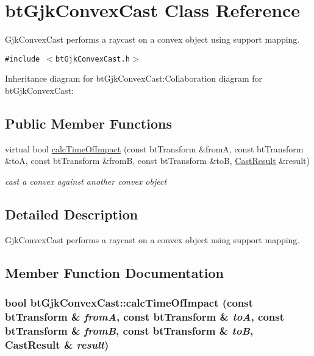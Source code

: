 \hypertarget{classbt_gjk_convex_cast}{
\section{btGjkConvexCast Class Reference}
\label{classbt_gjk_convex_cast}
}
GjkConvexCast performs a raycast on a convex object using support mapping.  


{\tt \#include $<$btGjkConvexCast.h$>$}

Inheritance diagram for btGjkConvexCast:Collaboration diagram for btGjkConvexCast:\subsection*{Public Member Functions}
\begin{CompactItemize}
\item 
virtual bool \hyperlink{classbt_gjk_convex_cast_814009e1ebc582495689f365a42ce2c1}{calcTimeOfImpact} (const btTransform \&fromA, const btTransform \&toA, const btTransform \&fromB, const btTransform \&toB, \hyperlink{structbt_convex_cast_1_1_cast_result}{CastResult} \&result)
\begin{CompactList}\small\item\em cast a convex against another convex object \item\end{CompactList}\end{CompactItemize}


\subsection{Detailed Description}
GjkConvexCast performs a raycast on a convex object using support mapping. 

\subsection{Member Function Documentation}
\hypertarget{classbt_gjk_convex_cast_814009e1ebc582495689f365a42ce2c1}{
\subsubsection[calcTimeOfImpact]{\setlength{\rightskip}{0pt plus 5cm}bool btGjkConvexCast::calcTimeOfImpact (const btTransform \& {\em fromA}, \/  const btTransform \& {\em toA}, \/  const btTransform \& {\em fromB}, \/  const btTransform \& {\em toB}, \/  {\bf CastResult} \& {\em result})}}
\label{classbt_gjk_convex_cast_814009e1ebc582495689f365a42ce2c1}


